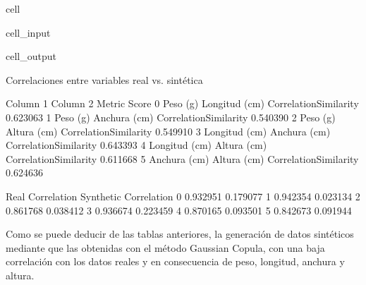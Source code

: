 \documentclass[a4paper,10pt,spanish]{jupyterBook}
\begin{document}
\begin{sphinxuseclass}{cell}\begin{sphinxVerbatimInput}

\begin{sphinxuseclass}{cell_input}
\begin{sphinxVerbatim}[commandchars=\\\{\}]
\end{sphinxVerbatim}

\end{sphinxuseclass}\end{sphinxVerbatimInput}
\begin{sphinxVerbatimOutput}

\begin{sphinxuseclass}{cell_output}
\begin{sphinxVerbatim}[commandchars=\\\{\}]
 Correlaciones entre variables real vs. sintética

        Column 1       Column 2                 Metric     Score  \PYGZbs{}
0       Peso (g)  Longitud (cm)  CorrelationSimilarity  0.623063
1       Peso (g)   Anchura (cm)  CorrelationSimilarity  0.540390
2       Peso (g)    Altura (cm)  CorrelationSimilarity  0.549910
3  Longitud (cm)   Anchura (cm)  CorrelationSimilarity  0.643393
4  Longitud (cm)    Altura (cm)  CorrelationSimilarity  0.611668
5   Anchura (cm)    Altura (cm)  CorrelationSimilarity  0.624636

   Real Correlation  Synthetic Correlation
0          0.932951               0.179077
1          0.942354               0.023134
2          0.861768              \PYGZhy{}0.038412
3          0.936674               0.223459
4          0.870165               0.093501
5          0.842673               0.091944
\end{sphinxVerbatim}

\end{sphinxuseclass}\end{sphinxVerbatimOutput}

\end{sphinxuseclass}
\sphinxAtStartPar
Como se puede deducir de las tablas anteriores, la generación de datos sintéticos mediante  que las obtenidas con el método Gaussian Copula, con una baja correlación con los datos reales y en consecuencia  de peso, longitud, anchura y altura.
\end{document}
